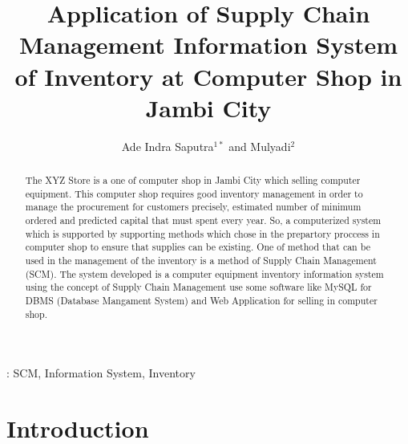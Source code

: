 \documentclass[12pt,a4paper,final]{iopart}
\begin{document}
\title[Preparing an article for INCITEST 2020]{Application of Supply Chain Management Information System of Inventory at Computer Shop in Jambi City}

\author{Ade Indra Saputra$^{1*}$ and Mulyadi$^{2}$}
\address{$^1$Master of Information Systems, Universitas Komputer Indonesia, Indonesia}
\address{$^2$Department of Information System, Universitas Dinamika Bangsa Jambi, Indonesia}




\begin{abstract}
The XYZ Store is a one of computer shop in Jambi City which selling computer equipment. This computer shop requires good inventory management in order to manage the procurement for customers precisely, estimated number of minimum ordered and predicted capital that must spent every year. So, a computerized system which is supported by supporting methods which chose in the prepartory proccess in computer shop to ensure that supplies can be existing. One of method that can be used in the management of the inventory is a method of Supply Chain Management (SCM). The system developed is a computer equipment inventory information system using the concept of Supply Chain Management use some software like MySQL for DBMS (Database Mangament System) and Web Application for selling in computer shop.

\end{abstract}

\vspace{2pc}
: SCM, Information System, Inventory

\section{Introduction}
\end{document}
